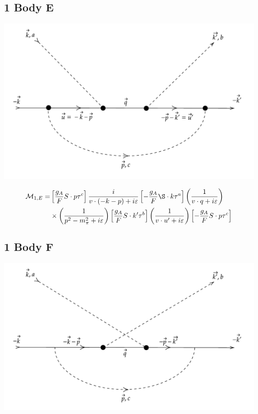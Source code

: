 \documentclass[11pt]{article}
\newcommand\mm{\mathcal{M}}
\begin{document}
\subsection{1 Body E}
\begin{center}
    \includegraphics[scale=0.6]{1e.pdf}
\end{center}
\begin{align}
    \mm_{1,E}= &\left[ \frac{g_A}{F} S\cdot p \tau^c \right]
    \frac{i}{v\cdot (-k-p)+i \varepsilon }
    \left[-\frac{g_A}{F}\S \cdot k \tau^a \right]
    \left(\frac{1}{v\cdot q + i \varepsilon}\right)\nonumber\\
               &\times 
               \left(\frac{1}{p^2 - m_\pi^2 + i \varepsilon}\right)
               \left[\frac{g_A}{F}S \cdot k' \tau^b \right]
            \left(\frac{1}{v\cdot u' + i \varepsilon}\right)
            \left[-\frac{g_A}{F}S \cdot p \tau^c \right]
\end{align}
\newpage
\subsection{1 Body F}
\begin{center}
    \includegraphics[scale=0.6]{1f.pdf}
\end{center}
\newpage
\end{document}
